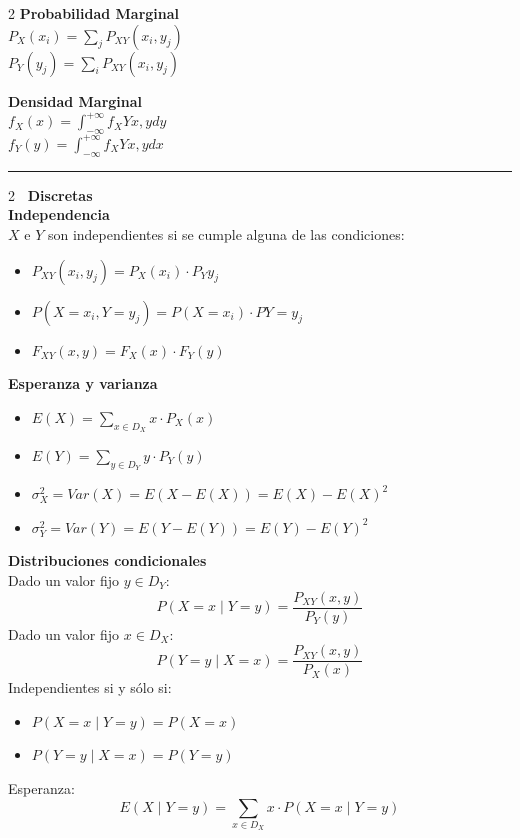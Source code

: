 \documentclass[10pt,a4paper]{article}
\begin{document}
\begin{tcolorbox}[title=Distribuciones Marginales]
    \begin{multicols}{2}
        \textbf{Probabilidad Marginal} \\
        $P_X(x_i) = \sum\limits_j P_{XY}(x_i, y_j)$ \\
        $P_Y(y_j) = \sum\limits_i P_{XY}(x_i, y_j)$

        \textbf{Densidad Marginal} \\
        $f_X(x) = \int_{-\infty}^{+\infty} f_XY{x, y} dy$ \\
        $f_Y(y) = \int_{-\infty}^{+\infty} f_XY{x, y} dx$
    \end{multicols}

    \hrule

    \begin{multicols}{2}
        {\large\bfseries\ Discretas}\\
        \textbf{Independencia} \\
        $X$ e $Y$ son independientes si se cumple alguna de las condiciones:
        \begin{itemize}
            \item $P_{XY}(x_i, y_j) = P_X(x_i) \cdot P_Y{y_j}$
            \item $P(X = x_i, Y = y_j) = P(X = x_i) \cdot P{Y = y_j}$
            \item $F_{XY}(x, y) = F_X(x) \cdot F_Y(y)$
        \end{itemize}

        \textbf{Esperanza y varianza} \\
        \begin{itemize}
            \item $E(X) = \sum\limits_{x \in D_X} x \cdot P_X(x)$
            \item $E(Y) = \sum\limits_{y \in D_Y} y \cdot P_Y(y)$
            \item $\sigma_X^2 = Var(X) = E(X - E(X)) = E(X) - E(X)^2$
            \item $\sigma_Y^2 = Var(Y) = E(Y - E(Y)) = E(Y) - E(Y)^2$
        \end{itemize}

        \textbf{Distribuciones condicionales} \\
        Dado un valor fijo $y \in D_Y$:
        \[
            P(X = x \mid Y = y) = \frac{P_{XY}(x, y)}{P_Y(y)}
        \]
        Dado un valor fijo $x \in D_X$:
        \[
            P(Y = y \mid X = x) = \frac{P_{XY}(x, y)}{P_X(x)}
        \]
        Independientes si y sólo si:
        \begin{itemize}
            \item $P(X = x \mid Y = y) = P(X = x)$
            \item $P(Y = y \mid X = x) = P(Y = y)$
        \end{itemize}
        Esperanza:
        \[
            E(X \mid Y=y) = \sum\limits_{x \in D_X} x \cdot P(X = x \mid Y = y)
        \]


\end{multicols}
\end{tcolorbox}
\end{document}
